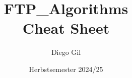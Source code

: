 \documentclass[11pt,a4paper,twocolumn]{article}
\title{\textbf{FTP\_Algorithms}\\
       \large Cheat Sheet}
\author{Diego Gil}
\date{Herbstsemester 2024/25}
\begin{document}
\onecolumn
\maketitle
\tableofcontents
\clearpage

\twocolumn

\clearpage


\clearpage



\end{document}
